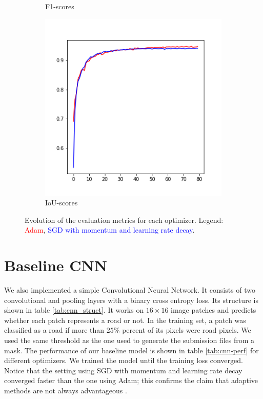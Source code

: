 \documentclass[10pt,conference,compsocconf]{IEEEtran}
\begin{document}
\begin{figure}[ht]
\begin{subfigure}{0.31\linewidth}
        \caption{F1-scores}
    \end{subfigure}
    \begin{subfigure}{0.31\linewidth}
        \centering
        \includegraphics[width=\linewidth]{doc/images/opt_iou_scores.png}
        \caption{IoU-scores}
    \end{subfigure}
    \caption{Evolution of the evaluation metrics for each optimizer. Legend: \textcolor{red}{Adam}, \textcolor{blue}{SGD with momentum and learning rate decay}.}
    \label{fig:opt_metrics}
\end{figure}

\section{Baseline CNN}

We also implemented a simple Convolutional Neural Network. It consists of two convolutional and pooling layers with a binary cross entropy loss. Its structure is shown in table \ref{tab:cnn_struct}. It works on $16 \times 16$ image patches and predicts whether each patch represents a road or not. In the training set, a patch was classified as a road if more than $25\%$ percent of its pixels were road pixels. We used the same threshold as the one used to generate the submission files from a mask. The performance of our baseline model is shown in table \ref{tab:cnn-perf} for different optimizers. We trained the model until the training loss converged. Notice that the setting using SGD with momentum and learning rate decay converged faster than the one using Adam; this confirms the claim that adaptive methods are not always advantageous \cite{wilson2018marginal}.
\end{document}
